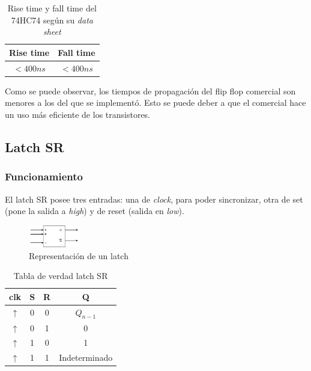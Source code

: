 \documentclass[../../e3_tp2_main.tex]{subfiles}
\begin{document}
\begin{table}[H]
\begin{center}
\begin{tabular}{|c|c|}
\hline
Rise time& Fall time \\
\hline \hline
$<400 n s$  & $<400 n s$ \\ \hline
\end{tabular}
\caption{Rise time y fall time del 74HC74 seg\'un su \textit{data sheet}} 
\end{center}
\end{table}

Como se puede observar, los tiempos de propagación del flip flop comercial son menores a los del que se implementó. Esto se puede deber a que el comercial hace un uso m\'as eficiente de los transistores.

\subsection{Latch SR}

\subsubsection{Funcionamiento}
El latch SR posee tres entradas: una de \textit{clock}, para poder sincronizar, otra de set (pone la salida a \textit{high}) y de reset (salida en \textit{low}).
\begin{figure}[H]	
	\centering
	\includegraphics[width=0.2\textwidth]{imagenes/lsr_b.png}
	\caption{Representaci\'on de un latch}
\end{figure}

\begin{table}[H]
\begin{center}
\begin{tabular}{|c|c|c|c|}
\hline
clk&S & R & Q\\
\hline \hline
$\uparrow$ & 0 & 0 & $Q_{n-1}$ \\ \hline
$\uparrow$ & 0 & 1 &0 \\ \hline
$\uparrow$ & 1 & 0 & 1 \\ \hline
$\uparrow$ & 1 &1 & Indeterminado \\ \hline

\end{tabular}
\caption{Tabla de verdad latch  SR} 
\end{center}
\end{table}
\end{document}
